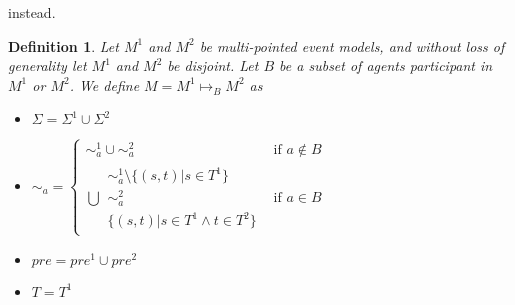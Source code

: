 \documentclass[12pt, a4paper, titlepage]{scrartcl}
\newtheorem{defn}{Definition}
\begin{document}
instead.
\begin{defn} \label{possTwo}
Let $M^1$ and $M^2$ be multi-pointed event models, and without loss of
generality let $M^1$ and $M^2$ be disjoint.
Let $B$ be a subset of agents participant in $M^1$ or $M^2$.
We define $M = M^1 \mapsto_B M^2$ as 
\begin{itemize}
  \item $\Sigma = \Sigma^1 \cup \Sigma^2$
  \item $\sim_a =
  \begin{cases}
    \sim^1_a \cup \sim^2_a & \text{if } a \notin B \\
    \bigcup \begin{array}{c}
      \sim^1_a \setminus \{(s,t) | s \in T^1 \} \\
      \sim^2_a \\
      \{(s,t) | s \in T^1 \land t \in T^2 \}
    \end{array} & \text{if } a \in B 
  \end{cases}$
  \item $pre = pre^1 \cup pre^2$
  \item $T = T^1$
\end{itemize}
\end{defn}
\end{document}
